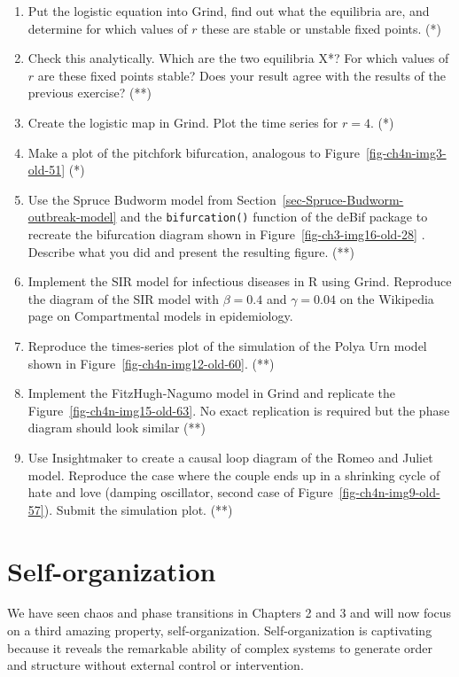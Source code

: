 \documentclass[
  a4paper,
  DIV=11,
  numbers=noendperiod,
  oneside]{scrreprt}
\begin{document}
\begin{enumerate}
\def\labelenumi{\arabic{enumi})}
\item
  Put the logistic equation into Grind, find out what the equilibria
  are, and determine for which values of \(r\) these are stable or
  unstable fixed points. (*)
\item
  Check this analytically. Which are the two equilibria X*? For which
  values of \(r\) are these fixed points stable? Does your result agree
  with the results of the previous exercise? (**)
\item
  Create the logistic map in Grind. Plot the time series for \(r = 4\).
  (*)
\item
  Make a plot of the pitchfork bifurcation, analogous to
  Figure~\ref{fig-ch4n-img3-old-51} (*)
\item
  Use the Spruce Budworm model from
  Section~\ref{sec-Spruce-Budworm-outbreak-model} and the
  \texttt{bifurcation()} function of the deBif package to recreate the
  bifurcation diagram shown in Figure~\ref{fig-ch3-img16-old-28} .
  Describe what you did and present the resulting figure. (**)
\item
  Implement the SIR model for infectious diseases in R using Grind.
  Reproduce the diagram of the SIR model with \(\beta = 0.4\) and
  \(\gamma = 0.04\) on the Wikipedia page on Compartmental models in
  epidemiology.
\item
  Reproduce the times-series plot of the simulation of the Polya Urn
  model shown in Figure~\ref{fig-ch4n-img12-old-60}. (**)
\item
  Implement the FitzHugh-Nagumo model in Grind and replicate the
  Figure~\ref{fig-ch4n-img15-old-63}. No exact replication is required
  but the phase diagram should look similar (**)
\item
  Use Insightmaker to create a causal loop diagram of the Romeo and
  Juliet model. Reproduce the case where the couple ends up in a
  shrinking cycle of hate and love (damping oscillator, second case of
  Figure~\ref{fig-ch4n-img9-old-57}). Submit the simulation plot. (**)
\end{enumerate}


\hypertarget{sec-ch5n}{%
\chapter{Self-organization}\label{sec-ch5n}}

We have seen chaos and phase transitions in Chapters 2 and 3 and will
now focus on a third amazing property, self-organization.
Self-organization is captivating because it reveals the remarkable
ability of complex systems to generate order and structure without
external control or intervention.
\end{document}
